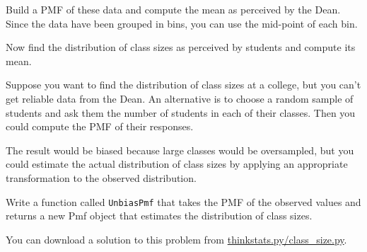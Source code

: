 \documentclass[12pt]{book}
\begin{document}
\begin{ex}

Build a PMF of these data and compute the mean as perceived by the
Dean.  Since the data have been grouped in bins, you can use the
mid-point of each bin.

Now find the distribution of class sizes as perceived by students
and compute its mean.  

Suppose you want to find the distribution of class sizes at a
college, but you can't get reliable data from the Dean.
An alternative is to choose a random sample of students and ask them
the number of students in each of their classes.  Then you could compute
the PMF of their responses.

The result would be biased because large classes
would be oversampled, but you could estimate the actual
distribution of class sizes by applying an appropriate transformation
to the observed distribution.

Write a function called \verb"UnbiasPmf" that takes the PMF of the
observed values and returns a new Pmf object that estimates the
distribution of class sizes.

You can download a solution to this problem from
\url{thinkstats.py/class_size.py}.

\end{ex}
\end{document}
